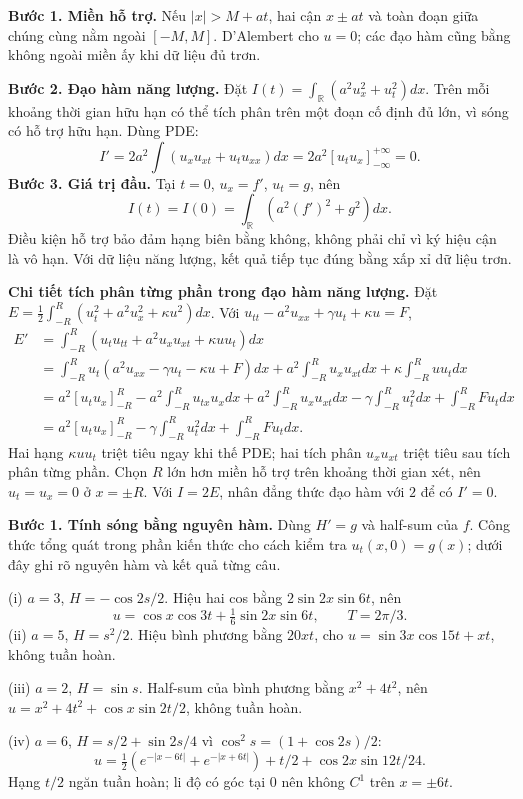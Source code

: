 \textbf{Bước 1. Miền hỗ trợ.} Nếu $|x|>M+at$, hai cận $x\pm at$ và toàn đoạn giữa chúng cùng nằm ngoài $[-M,M]$. D'Alembert cho $u=0$; các đạo hàm cũng bằng không ngoài miền ấy khi dữ liệu đủ trơn.

\textbf{Bước 2. Đạo hàm năng lượng.} Đặt $I(t)=\int_{\mathbb R}(a^2u_x^2+u_t^2)dx$. Trên mỗi khoảng thời gian hữu hạn có thể tích phân trên một đoạn cố định đủ lớn, vì sóng có hỗ trợ hữu hạn. Dùng PDE:
\[I'=2a^2\int(u_xu_{xt}+u_tu_{xx})dx=2a^2[u_tu_x]_{-\infty}^{+\infty}=0.\]
\textbf{Bước 3. Giá trị đầu.} Tại $t=0$, $u_x=f'$, $u_t=g$, nên
\[I(t)=I(0)=\int_{\mathbb R}(a^2(f')^2+g^2)dx.\]
Điều kiện hỗ trợ bảo đảm hạng biên bằng không, không phải chỉ vì ký hiệu cận là vô hạn. Với dữ liệu năng lượng, kết quả tiếp tục đúng bằng xấp xỉ dữ liệu trơn.

\textbf{Chi tiết tích phân từng phần trong đạo hàm năng lượng.} Đặt $E=\frac12\int_{-R}^R(u_t^2+a^2u_x^2+\kappa u^2)dx$. Với $u_{tt}-a^2u_{xx}+\gamma u_t+\kappa u=F$,
\[\begin{aligned}
E'&=\int_{-R}^R(u_tu_{tt}+a^2u_xu_{xt}+\kappa uu_t)dx\\
&=\int_{-R}^Ru_t(a^2u_{xx}-\gamma u_t-\kappa u+F)dx
+a^2\int_{-R}^Ru_xu_{xt}dx+\kappa\int_{-R}^Ruu_tdx\\
&=a^2[u_tu_x]_{-R}^R-a^2\int_{-R}^Ru_{tx}u_xdx
+a^2\int_{-R}^Ru_xu_{xt}dx-\gamma\int_{-R}^Ru_t^2dx+\int_{-R}^RFu_tdx\\
&=a^2[u_tu_x]_{-R}^R-\gamma\int_{-R}^Ru_t^2dx+\int_{-R}^RFu_tdx.
\end{aligned}\]
Hai hạng $\kappa uu_t$ triệt tiêu ngay khi thế PDE; hai tích phân $u_xu_{xt}$ triệt tiêu sau tích phân từng phần. Chọn $R$ lớn hơn miền hỗ trợ trên khoảng thời gian xét, nên $u_t=u_x=0$ ở $x=\pm R$. Với $I=2E$, nhân đẳng thức đạo hàm với $2$ để có $I'=0$.

\textbf{Bước 1. Tính sóng bằng nguyên hàm.} Dùng $H'=g$ và half-sum của $f$. Công thức tổng quát trong phần kiến thức cho cách kiểm tra $u_t(x,0)=g(x)$; dưới đây ghi rõ nguyên hàm và kết quả từng câu.

(i) $a=3$, $H=-\cos2s/2$. Hiệu hai cos bằng $2\sin2x\sin6t$, nên
\[u=\cos x\cos3t+\tfrac16\sin2x\sin6t,\qquad T=2\pi/3.\]
(ii) $a=5$, $H=s^2/2$. Hiệu bình phương bằng $20xt$, cho $u=\sin3x\cos15t+xt$, không tuần hoàn.

(iii) $a=2$, $H=\sin s$. Half-sum của bình phương bằng $x^2+4t^2$, nên $u=x^2+4t^2+\cos x\sin2t/2$, không tuần hoàn.

(iv) $a=6$, $H=s/2+\sin2s/4$ vì $\cos^2s=(1+\cos2s)/2$:
\[u=\tfrac12(e^{-|x-6t|}+e^{-|x+6t|})+t/2+\cos2x\sin12t/24.\]
Hạng $t/2$ ngăn tuần hoàn; li độ có góc tại $0$ nên không $C^1$ trên $x=\pm6t$.

